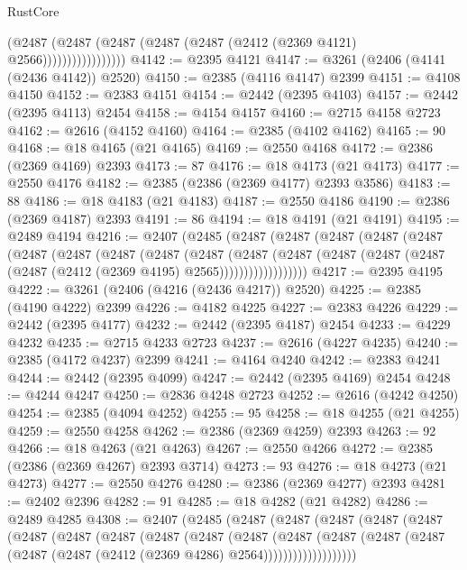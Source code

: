 \begin{lexlean}{RustCore}
\begin{coremodule}
                          (@2487
                            (@2487 (@2487 (@2487 (@2487 (@2412 (@2369 @4121) @2566)))))))))))))))))
@4142 := @2395 @4121
@4147 := @3261 (@2406 (@4141 (@2436 @4142)) @2520)
@4150 := @2385 (@4116 @4147) @2399
@4151 := @4108 @4150
@4152 := @2383 @4151
@4154 := @2442 (@2395 @4103)
@4157 := @2442 (@2395 @4113) @2454
@4158 := @4154 @4157
@4160 := @2715 @4158 @2723
@4162 := @2616 (@4152 @4160)
@4164 := @2385 (@4102 @4162)
@4165 := 90
@4168 := @18 @4165 (@21 @4165)
@4169 := @2550 @4168
@4172 := @2386 (@2369 @4169) @2393
@4173 := 87
@4176 := @18 @4173 (@21 @4173)
@4177 := @2550 @4176
@4182 := @2385 (@2386 (@2369 @4177) @2393 @3586)
@4183 := 88
@4186 := @18 @4183 (@21 @4183)
@4187 := @2550 @4186
@4190 := @2386 (@2369 @4187) @2393
@4191 := 86
@4194 := @18 @4191 (@21 @4191)
@4195 := @2489 @4194
@4216 := @2407
    (@2485
      (@2487
        (@2487
          (@2487
            (@2487
              (@2487
                (@2487
                  (@2487
                    (@2487
                      (@2487
                        (@2487
                          (@2487
                            (@2487
                              (@2487
                                (@2487 (@2487 (@2487 (@2412 (@2369 @4195) @2565))))))))))))))))))
@4217 := @2395 @4195
@4222 := @3261 (@2406 (@4216 (@2436 @4217)) @2520)
@4225 := @2385 (@4190 @4222) @2399
@4226 := @4182 @4225
@4227 := @2383 @4226
@4229 := @2442 (@2395 @4177)
@4232 := @2442 (@2395 @4187) @2454
@4233 := @4229 @4232
@4235 := @2715 @4233 @2723
@4237 := @2616 (@4227 @4235)
@4240 := @2385 (@4172 @4237) @2399
@4241 := @4164 @4240
@4242 := @2383 @4241
@4244 := @2442 (@2395 @4099)
@4247 := @2442 (@2395 @4169) @2454
@4248 := @4244 @4247
@4250 := @2836 @4248 @2723
@4252 := @2616 (@4242 @4250)
@4254 := @2385 (@4094 @4252)
@4255 := 95
@4258 := @18 @4255 (@21 @4255)
@4259 := @2550 @4258
@4262 := @2386 (@2369 @4259) @2393
@4263 := 92
@4266 := @18 @4263 (@21 @4263)
@4267 := @2550 @4266
@4272 := @2385 (@2386 (@2369 @4267) @2393 @3714)
@4273 := 93
@4276 := @18 @4273 (@21 @4273)
@4277 := @2550 @4276
@4280 := @2386 (@2369 @4277) @2393
@4281 := @2402 @2396
@4282 := 91
@4285 := @18 @4282 (@21 @4282)
@4286 := @2489 @4285
@4308 := @2407
    (@2485
      (@2487
        (@2487
          (@2487
            (@2487
              (@2487
                (@2487
                  (@2487
                    (@2487
                      (@2487
                        (@2487
                          (@2487
                            (@2487
                              (@2487
                                (@2487
                                  (@2487 (@2487 (@2487 (@2412 (@2369 @4286) @2564)))))))))))))))))))

\end{coremodule}
\end{lexlean}
